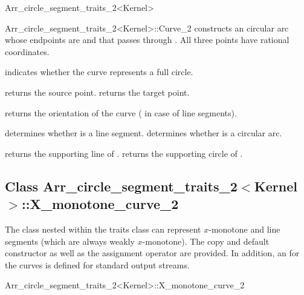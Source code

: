 \begin{ccRefClass}{Arr_circle_segment_traits_2<Kernel>}
\begin{ccClass}{Arr_circle_segment_traits_2<Kernel>::Curve_2}
    {constructs an circular arc whose endpoints are  and
      that passes through . All three points have
     rational coordinates.
     }

\ccAccessFunctions

  {indicates whether the curve represents a full circle.}

  {returns the source point.
   }
\ccGlue
{}
  {returns the target point.
   }

  {returns the orientation of the curve ( in case of
   line segments).}

  {determines whether \ccVar{} is a line segment.}
\ccGlue
{}
  {determines whether \ccVar{} is a circular arc.}

  {returns the supporting line of \ccVar{}.
   }
\ccGlue
{}
  {returns the supporting circle of \ccVar{}.
   }

\end{ccClass}

\subsection*{Class 
Arr\_circle\_segment\_traits\_2$<$Kernel$>$::X\_monotone\_curve\_2}

The  class nested within the traits class can
represent $x$-monotone and line segments (which are always weakly $x$-monotone).
The copy and default constructor as well as the assignment operator are
provided. In addition, an  for the curves is defined for
standard output streams.

\begin{ccClass}{Arr_circle_segment_traits_2<Kernel>::X_monotone_curve_2}


\end{ccClass}
\end{ccRefClass}
